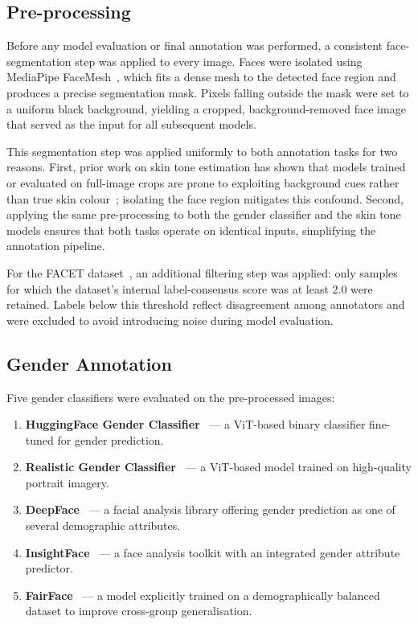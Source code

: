 \subsection{Pre-processing}
\label{sec:annotation_preprocessing}

Before any model evaluation or final annotation was performed, a consistent face-segmentation step was applied to every image. Faces were isolated using MediaPipe FaceMesh~\cite{kartynnik2019realtime}, which fits a dense mesh to the detected face region and produces a precise segmentation mask. Pixels falling outside the mask were set to a uniform black background, yielding a cropped, background-removed face image that served as the input for all subsequent models.

This segmentation step was applied uniformly to both annotation tasks for two reasons. First, prior work on skin tone estimation has shown that models trained or evaluated on full-image crops are prone to exploiting background cues rather than true skin colour~\cite{wu2023skintone}; isolating the face region mitigates this confound. Second, applying the same pre-processing to both the gender classifier and the skin tone models ensures that both tasks operate on identical inputs, simplifying the annotation pipeline.

For the FACET dataset~\cite{gustafson2023facet}, an additional filtering step was applied: only samples for which the dataset's internal label-consensus score was at least 2.0 were retained. Labels below this threshold reflect disagreement among annotators and were excluded to avoid introducing noise during model evaluation.

\subsection{Gender Annotation}
\label{sec:gender_annotation}

Five gender classifiers were evaluated on the pre-processed images:
\begin{enumerate}
	\item \textbf{HuggingFace Gender Classifier}~\cite{rizvandwiki2023gender} — a ViT-based binary classifier fine-tuned for gender prediction.
	\item \textbf{Realistic Gender Classifier}~\cite{prithivMLmods2024realistic} — a ViT-based model trained on high-quality portrait imagery.
	\item \textbf{DeepFace}~\cite{serengil2020deepface} — a facial analysis library offering gender prediction as one of several demographic attributes.
	\item \textbf{InsightFace}~\cite{deng2019insightface} — a face analysis toolkit with an integrated gender attribute predictor.
	\item \textbf{FairFace}~\cite{karkkainen2021fairface} — a model explicitly trained on a demographically balanced dataset to improve cross-group generalisation.
\end{enumerate}

